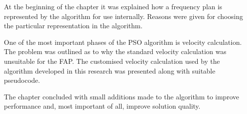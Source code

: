 At the beginning of the chapter it was explained how a frequency plan is represented by the algorithm for use internally. Reasons were given for choosing the particular representation in the algorithm.

One of the most important phases of the PSO algorithm is velocity calculation. The problem was outlined as to why the standard velocity calculation was unsuitable for the FAP. The customised velocity calculation used by the algorithm developed in this research was presented along with suitable pseudocode.

The chapter concluded with small additions made to the algorithm to improve performance and, most important of all, improve solution quality.
